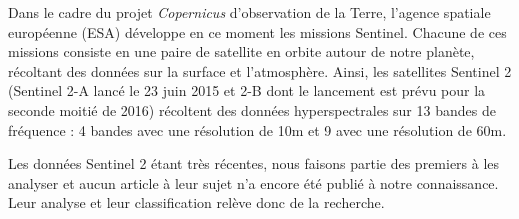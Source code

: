 \documentclass[a4paper,10pt]{article}
\begin{document}
Dans le cadre du projet \textit{Copernicus} d'observation de la Terre, l'agence spatiale européenne (ESA) développe en ce moment les missions Sentinel. Chacune de ces missions consiste en une paire de satellite en orbite autour de notre planète, récoltant des données sur la surface et l'atmosphère. Ainsi, les satellites Sentinel 2 (Sentinel 2-A lancé le 23 juin 2015 et 2-B dont le lancement est prévu pour la seconde moitié de 2016)\cite{sent2} récoltent des données hyperspectrales sur 13 bandes de fréquence : 4 bandes avec une résolution de 10m et 9 avec une résolution de 60m.

Les données Sentinel 2 étant très récentes, nous faisons partie des premiers à les analyser et aucun article à leur sujet n'a encore été publié à notre connaissance. Leur analyse et leur classification relève donc de la recherche.




\end{document}
